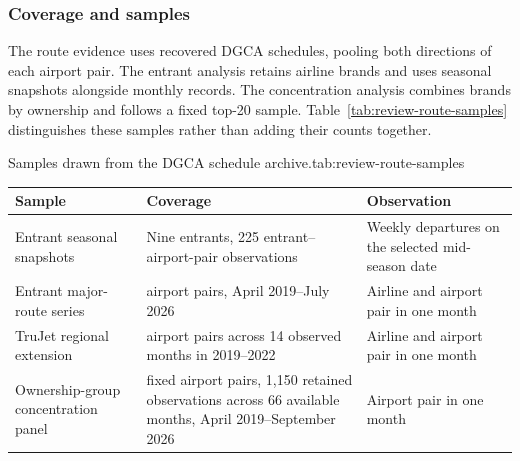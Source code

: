 \subsubsection{Coverage and samples}
The route evidence uses recovered DGCA schedules, pooling both directions of each airport pair. The entrant analysis retains airline brands and uses seasonal snapshots alongside monthly records. The concentration analysis combines brands by ownership and follows a fixed top-20 sample. Table~\ref{tab:review-route-samples} distinguishes these samples rather than adding their counts together.
\begin{resultstable}{Samples drawn from the DGCA schedule archive.}{tab:review-route-samples}
\color{black}
\begin{tabular}{|>{\raggedright\arraybackslash}p{}|>{\raggedright\arraybackslash}p{}|>{\raggedright\arraybackslash}p{}|}
\hline
\textbf{Sample} & \textbf{Coverage} & \textbf{Observation} \\
\hline
Entrant seasonal snapshots & Nine entrants, 225 entrant--airport-pair observations & Weekly departures on the selected mid-season date \\
\hline
Entrant major-route series & 20 airport pairs, April 2019--July 2026 & Airline and airport pair in one month \\
\hline
TruJet regional extension & 30 airport pairs across 14 observed months in 2019--2022 & Airline and airport pair in one month \\
\hline
Ownership-group concentration panel & 20 fixed airport pairs, 1,150 retained observations across 66 available months, April 2019--September 2026 & Airport pair in one month \\
\hline
\end{tabular}
\par{}
\end{resultstable}

